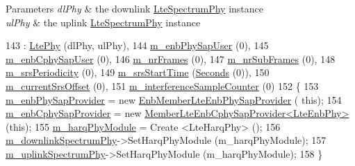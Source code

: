 \begin{DoxyParams}{Parameters}
{\em dl\+Phy} & the downlink \hyperlink{classns3_1_1LteSpectrumPhy}{Lte\+Spectrum\+Phy} instance \\
\hline
{\em ul\+Phy} & the uplink \hyperlink{classns3_1_1LteSpectrumPhy}{Lte\+Spectrum\+Phy} instance \\
\hline
\end{DoxyParams}

\begin{DoxyCode}
143   : \hyperlink{classns3_1_1LtePhy_a14ba34ce91bb83a5eebb4690e0c2cfbf}{LtePhy} (dlPhy, ulPhy),
144     \hyperlink{classns3_1_1LteEnbPhy_a731048734464383920acca0e20a1f020}{m\_enbPhySapUser} (0),
145     \hyperlink{classns3_1_1LteEnbPhy_ad7c71cecaf12b07cad7aebadacb88ecb}{m\_enbCphySapUser} (0),
146     \hyperlink{classns3_1_1LteEnbPhy_ae8464d0dff85be592774739e81f28942}{m\_nrFrames} (0),
147     \hyperlink{classns3_1_1LteEnbPhy_a21c4d540ccd4813df02001a5e0159a35}{m\_nrSubFrames} (0),
148     \hyperlink{classns3_1_1LteEnbPhy_a00aa262d5518685d154da3631cc03670}{m\_srsPeriodicity} (0),
149     \hyperlink{classns3_1_1LteEnbPhy_a019eaaa6cca7396f9b89fdb5125713e9}{m\_srsStartTime} (\hyperlink{group__timecivil_ga33c34b816f8ff6628e33d5c8e9713b9e}{Seconds} (0)),
150     \hyperlink{classns3_1_1LteEnbPhy_a8356f950997d27723f4997ddb797e589}{m\_currentSrsOffset} (0),
151     \hyperlink{classns3_1_1LteEnbPhy_ae02d838d9c62766bd75c1cce96bc802b}{m\_interferenceSampleCounter} (0)
152 \{
153   \hyperlink{classns3_1_1LteEnbPhy_a8c195412adfe95d66ee4b7f1dbe4ab00}{m\_enbPhySapProvider} = \textcolor{keyword}{new} \hyperlink{classns3_1_1LteEnbPhy_ab39a4c7aed169d2603e336c7248c6fc3}{EnbMemberLteEnbPhySapProvider} (\textcolor{keyword}{
      this});
154   \hyperlink{classns3_1_1LteEnbPhy_ae8806a2346e70a3c93542fea54ebac52}{m\_enbCphySapProvider} = \textcolor{keyword}{new} 
      \hyperlink{classns3_1_1LteEnbPhy_af5ddf6fa42c29094f7f3b38c31497c45}{MemberLteEnbCphySapProvider<LteEnbPhy>} (\textcolor{keyword}{this});
155   \hyperlink{classns3_1_1LteEnbPhy_af1e6a57f81f6fcc0f670aa81131447ce}{m\_harqPhyModule} = Create <LteHarqPhy> ();
156   \hyperlink{classns3_1_1LtePhy_a9d9d4f9b07919b941583dca6f4789762}{m\_downlinkSpectrumPhy}->SetHarqPhyModule (m\_harqPhyModule);
157   \hyperlink{classns3_1_1LtePhy_addc3110b5a1f7b63c52f4ce8ca59c6cd}{m\_uplinkSpectrumPhy}->SetHarqPhyModule (m\_harqPhyModule);
158 \}
\end{DoxyCode}
